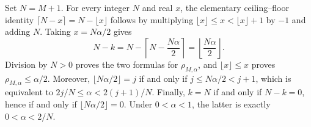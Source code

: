 Set \(N=M+1\). For every integer \(N\) and real \(x\), the elementary ceiling--floor identity \(\lceil N-x\rceil=N-\lfloor x\rfloor\) follows by multiplying \(\lfloor x\rfloor\le x<\lfloor x\rfloor+1\) by \(-1\) and adding \(N\). Taking \(x=N\alpha/2\) gives \[N-k=N-\left\lceil N-\frac{N\alpha}{2}\right\rceil=\left\lfloor\frac{N\alpha}{2}\right\rfloor.\] Division by \(N>0\) proves the two formulas for \(\rho_{M,\alpha}\), and \(\lfloor x\rfloor\le x\) proves \(\rho_{M,\alpha}\le\alpha/2\). Moreover, \(\lfloor N\alpha/2\rfloor=j\) if and only if \(j\le N\alpha/2<j+1\), which is equivalent to \(2j/N\le\alpha<2(j+1)/N\). Finally, \(k=N\) if and only if \(N-k=0\), hence if and only if \(\lfloor N\alpha/2\rfloor=0\). Under \(0<\alpha<1\), the latter is exactly \(0<\alpha<2/N\).